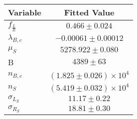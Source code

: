 \begin{tabular}[t]{lc}
\hline
Variable &Fitted Value\\
\hline\hline
$f_{\frac{L}{R}}$&$0.466\pm0.024$\\
\hline
$\lambda_{B,c}$&$-0.00061\pm0.00012$\\
\hline
$\mu_S$&$5278.922\pm0.080$\\
\hline
B&$4389\pm63$\\
\hline
$n_{B,c}$&$(1.825\pm0.026)\times 10^4$\\
\hline
$n_S$&$(5.419\pm0.032)\times 10^4$\\
\hline
$\sigma_{L_S}$&$11.17\pm0.22$\\
\hline
$\sigma_{R_S}$&$18.81\pm0.30$\\
\hline
\end{tabular}